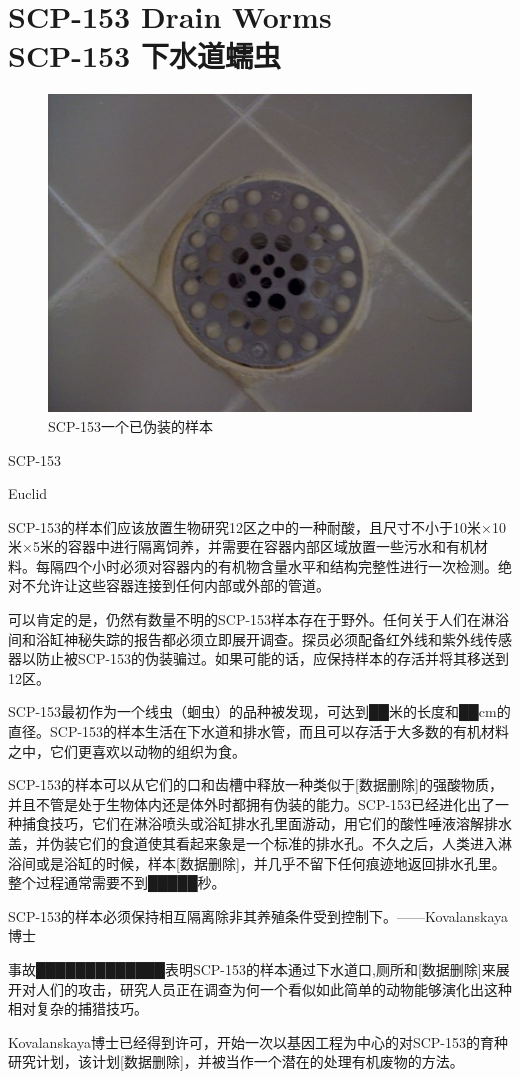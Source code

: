 \chapter[SCP-153 下水道蠕虫]{
    SCP-153 Drain Worms\\
    SCP-153 下水道蠕虫
}

\label{chap:SCP-153}

\begin{figure}[H]
    \centering
    \includegraphics[width=0.5\linewidth]{images/SCP-153.jpg}
    \caption*{SCP-153一个已伪装的样本}
\end{figure}

SCP-153

Euclid

SCP-153的样本们应该放置生物研究12区之中的一种耐酸，且尺寸不小于10米×10米×5米的容器中进行隔离饲养，并需要在容器内部区域放置一些污水和有机材料。每隔四个小时必须对容器内的有机物含量水平和结构完整性进行一次检测。绝对不允许让这些容器连接到任何内部或外部的管道。

可以肯定的是，仍然有数量不明的SCP-153样本存在于野外。任何关于人们在淋浴间和浴缸神秘失踪的报告都必须立即展开调查。探员必须配备红外线和紫外线传感器以防止被SCP-153的伪装骗过。如果可能的话，应保持样本的存活并将其移送到12区。

SCP-153最初作为一个线虫（蛔虫）的品种被发现，可达到██米的长度和██cm的直径。SCP-153的样本生活在下水道和排水管，而且可以存活于大多数的有机材料之中，它们更喜欢以动物的组织为食。

SCP-153的样本可以从它们的口和齿槽中释放一种类似于{[}数据删除]的强酸物质，并且不管是处于生物体内还是体外时都拥有伪装的能力。SCP-153已经进化出了一种捕食技巧，它们在淋浴喷头或浴缸排水孔里面游动，用它们的酸性唾液溶解排水盖，并伪装它们的食道使其看起来象是一个标准的排水孔。不久之后，人类进入淋浴间或是浴缸的时候，样本{[}数据删除]，并几乎不留下任何痕迹地返回排水孔里。整个过程通常需要不到█████秒。

SCP-153的样本必须保持相互隔离除非其养殖条件受到控制下。——Kovalanskaya博士

事故█████████████表明SCP-153的样本通过下水道口,厕所和{[}数据删除]来展开对人们的攻击，研究人员正在调查为何一个看似如此简单的动物能够演化出这种相对复杂的捕猎技巧。

Kovalanskaya博士已经得到许可，开始一次以基因工程为中心的对SCP-153的育种研究计划，该计划{[}数据删除]，并被当作一个潜在的处理有机废物的方法。
